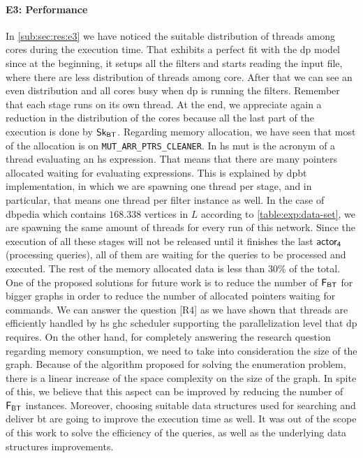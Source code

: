 \paragraph{E3: Performance} In \autoref{sub:sec:res:e3} we have noticed the suitable distribution of threads among cores during the execution time. 
That exhibits a perfect fit with the \acrshort{dp} model since at the beginning, it setups all the filters and starts reading the input file, where there are less distribution of threads among core. 
After that we can see an even distribution and all cores busy when \acrshort{dp} is running the filters. Remember that each stage runs on its own thread. At the end, we appreciate again a reduction in the distribution of the cores because all the last part of the execution is done by $\mathsf{Sk_{BT}}$.
Regarding memory allocation, we have seen that most of the allocation is on \texttt{MUT_ARR_PTRS_CLEANER}.
In \acrlong{hs} \acrshort{mut} is the acronym of a thread evaluating an \acrshort{hs} expression.
That means that there are many pointers allocated waiting for evaluating expressions. This is explained by \acrshort{dpbt} implementation, in which we are spawning one
thread per stage, and in particular, that means one thread per filter instance as well. In the case of \acrshort{dbpedia} which contains $168.338$ vertices in 
$L$ according to \autoref{table:exp:data-set}, we are spawning the same amount of threads for every run of this network. Since the execution of all these stages will not be released until it finishes the last $\mathsf{actor_4}$ (processing queries), all of them are waiting for the queries to be processed and executed.
The rest of the memory allocated data is less than $30\%$ of the total.
One of the proposed solutions for future work is to reduce the number of $\mathsf{F_{BT}}$ for bigger graphs in order to reduce the number of allocated pointers waiting for commands.
We can answer the question [R4] as we have shown that threads are efficiently handled by \acrshort{hs} \acrshort{ghc} scheduler supporting the parallelization level that \acrshort{dp} requires. 
On the other hand, for completely answering the research question regarding memory consumption, we need to take into consideration the size of the graph.
Because of the algorithm proposed for solving the enumeration problem, there is a linear increase of the space complexity on the size of the graph. In spite of this, we believe that this aspect can be improved by reducing the number of $\mathsf{F_{BT}}$ instances. Moreover, choosing suitable data structures used for searching and deliver \acrshort{bt} are going to improve the execution time as well. 
It was out of the scope of this work to solve the efficiency of the queries, as well as the underlying data structures improvements. 



